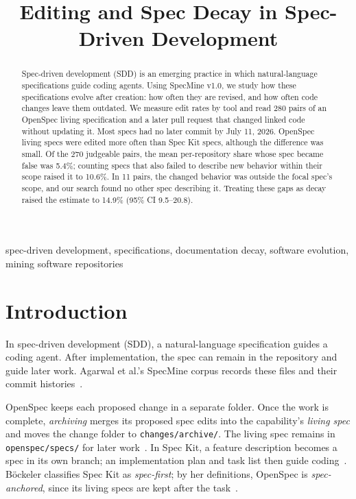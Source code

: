 \documentclass[10pt,conference]{IEEEtran}
\begin{document}
\title{Editing and Spec Decay in Spec-Driven Development}

\author{}

\maketitle

\begin{abstract}
Spec-driven development (SDD) is an emerging practice in which natural-language specifications guide coding agents. Using SpecMine v1.0, we study how these specifications evolve after creation: how often they are revised, and how often code changes leave them outdated. We measure edit rates by tool and read 280 pairs of an OpenSpec living specification and a later pull request that changed linked code without updating it. Most specs had no later commit by July 11, 2026. OpenSpec living specs were edited more often than Spec Kit specs, although the difference was small. Of the 270 judgeable pairs, the mean per-repository share whose spec became false was 5.4\%; counting specs that also failed to describe new behavior within their scope raised it to 10.6\%. In 11 pairs, the changed behavior was outside the focal spec's scope, and our search found no other spec describing it. Treating these gaps as decay raised the estimate to 14.9\% (95\% CI 9.5--20.8).
\end{abstract}

\begin{IEEEkeywords}
spec-driven development, specifications, documentation decay, software evolution, mining software repositories
\end{IEEEkeywords}

\section{Introduction}
In spec-driven development (SDD), a natural-language specification guides a coding agent. After implementation, the spec can remain in the repository and guide later work. Agarwal et al.'s SpecMine corpus records these files and their commit histories~\cite{agarwal2026sdd}.

OpenSpec keeps each proposed change in a separate folder. Once the work is complete, \emph{archiving} merges its proposed spec edits into the capability's \emph{living spec} and moves the change folder to \texttt{changes/archive/}. The living spec remains in \texttt{openspec/specs/} for later work~\cite{openspecdocs}. In Spec Kit, a feature description becomes a spec in its own branch; an implementation plan and task list then guide coding~\cite{speckitdocs}. B\"ockeler classifies Spec Kit as \emph{spec-first}; by her definitions, OpenSpec is \emph{spec-anchored}, since its living specs are kept after the task~\cite{bockeler2025sdd}.
\end{document}
